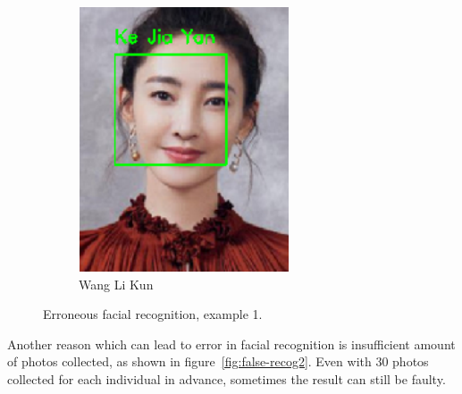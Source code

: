 \begin{figure}[!htb]
\begin{subfigure}[b]{0.3\linewidth}
    \includegraphics[width=\linewidth]{figures/false-recog-error1.png}
    \caption{Wang Li Kun}
  \end{subfigure}
  \caption{Erroneous facial recognition, example 1.}
  \label{fig:false-recog1}
\end{figure}


Another reason which can lead to error in facial recognition is insufficient amount of photos collected,
as shown in figure~\ref{fig:false-recog2}. Even with 30 photos collected for each individual in advance,
sometimes the result can still be faulty.
\vspace{0.2cm}

